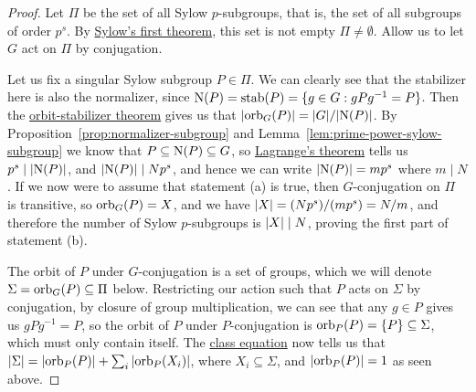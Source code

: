 \begin{proof}
    Let \(\Pi\) be the set of all Sylow \(p\)-subgroups,
    that is, the set of all subgroups of order \(p^s\).
    By \hyperref[thm:sylow-1]{Sylow's first theorem},
    this set is not empty \(\Pi \neq \emptyset\).
    Allow us to let \(G\) act on \(\Pi\) by conjugation.

    Let us fix a singular Sylow subgroup \(P \in \Pi\).
    We can clearly see that the stabilizer here is also the normalizer,
    since \(\operatorname{N}(P) = \operatorname{stab}(P) = \{g \in G : gPg^{-1} = P\}\).
    Then the \hyperref[cor:orbit-stabilizer]{orbit-stabilizer theorem}
    gives us that \(\abs{\operatorname{orb}_G(P)} = \abs{G}/\abs{\operatorname{N}(P)}\).
    By Proposition~\ref{prop:normalizer-subgroup}
    and Lemma~\ref{lem:prime-power-sylow-subgroup}
    we know that \(P \subseteq \operatorname{N}(P) \subseteq G\),
    so \hyperref[thm:lagrange]{Lagrange's theorem} tells us
    \(p^s \mid \abs{\operatorname{N}(P)}\),
    and \(\abs{\operatorname{N}(P)} \mid Np^s\),
    and hence we can write \(\abs{\operatorname{N}(P)} = mp^s\)
    where \(m \mid N\).
    If we now were to assume that statement (a) is true,
    then \(G\)-conjugation on \(\Pi\) is transitive,
    so \(\operatorname{orb}_G(P) = X\), and we have \(\abs{X} = (Np^s)/(mp^s) = N/m\),
    and therefore the number of Sylow \(p\)-subgroups
    is \(\abs{X} \mid N\),
    proving the first part of statement (b).

    The orbit of \(P\) under \(G\)-conjugation is a set of groups,
    which we will denote \(\Sigma = \operatorname{orb}_G(P) \subseteq \Pi\) below.
    Restricting our action such that \(P\) acts on \(\Sigma\) by conjugation,
    by closure of group multiplication,
    we can see that any \(g \in P\) gives us \(gPg^{-1} = P\),
    so the orbit of \(P\) under \(P\)-conjugation is
    \(\operatorname{orb}_P(P) = \{P\} \subseteq \Sigma\),
    which must only contain itself.
    The \hyperref[thm:class-equation]{class equation} now tells us that
    \(\abs{\Sigma} = \abs{\operatorname{orb}_P(P)} + \sum_i \abs{\operatorname{orb}_P(X_i)}\),
    where \(X_i \subseteq \Sigma\),
    and \(\abs{\operatorname{orb}_P(P)} = 1\) as seen above.


\end{proof}
